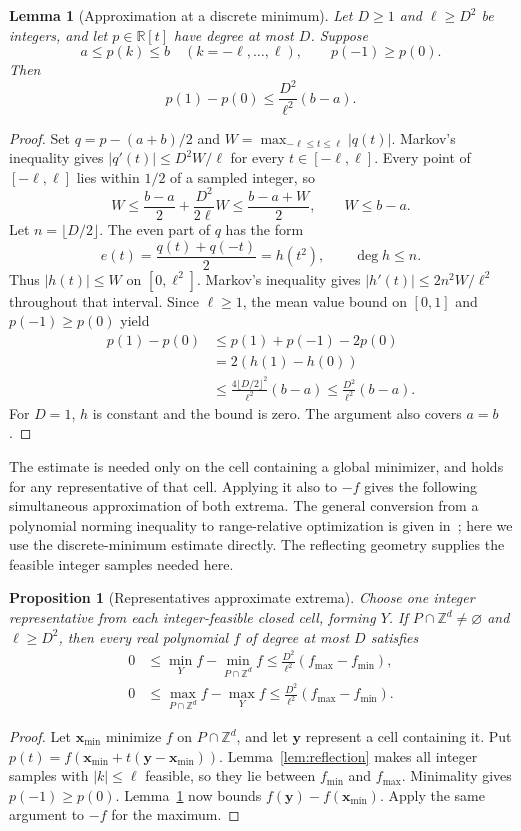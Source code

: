 \documentclass[final,5p,times,twocolumn]{elsarticle}
\newtheorem{lemma}[theorem]{Lemma}
\newtheorem{proposition}[theorem]{Proposition}
\theoremstyle{definition}\newtheorem{definition}{Definition}[section]
\theoremstyle{remark}\newtheorem{remark}[theorem]{Remark}
\newcommand{\R}{\mathbb R}\newcommand{\Q}{\mathbb Q}\newcommand{\Z}{\mathbb Z}
\begin{document}
\begin{lemma}[Approximation at a discrete minimum]\label{lem:markov}
Let $D\ge1$ and $\ell\ge D^2$ be integers, and let $p\in\R[t]$ have degree at most $D$. Suppose
\[
 a\le p(k)\le b\quad(k=-\ell,\ldots,\ell),\qquad p(-1)\ge p(0).
\]
Then
\[
 p(1)-p(0)\le \frac{D^2}{\ell^2}(b-a).
\]
\end{lemma}
\begin{proof}
Set $q=p-(a+b)/2$ and $W=\max_{-\ell\le t\le\ell}|q(t)|$. Markov's inequality gives $|q'(t)|\le D^2W/\ell$ for every $t\in[-\ell,\ell]$. Every point of $[-\ell,\ell]$ lies within $1/2$ of a sampled integer, so
\[
 W\le \frac{b-a}{2}+\frac{D^2}{2\ell}W\le\frac{b-a+W}{2},
 \qquad W\le b-a.
\]
Let $n=\lfloor D/2\rfloor$. The even part of $q$ has the form
\[
 e(t)=\frac{q(t)+q(-t)}2=h(t^2),\qquad \deg h\le n.
\]
Thus $|h(t)|\le W$ on $[0,\ell^2]$. Markov's inequality gives $|h'(t)|\le 2n^2W/\ell^2$ throughout that interval. Since $\ell\ge1$, the mean value bound on $[0,1]$ and $p(-1)\ge p(0)$ yield
\[
\begin{aligned}
 p(1)-p(0)&\le p(1)+p(-1)-2p(0)\\
 &=2(h(1)-h(0))\\
 &\le\frac{4\lfloor D/2\rfloor^2}{\ell^2}(b-a)
 \le\frac{D^2}{\ell^2}(b-a).
\end{aligned}
\]
For $D=1$, $h$ is constant and the bound is zero. The argument also covers $a=b$.
\end{proof}

The estimate is needed only on the cell containing a global minimizer, and holds for any representative of that cell. Applying it also to $-f$ gives the following simultaneous approximation of both extrema. The general conversion from a polynomial norming inequality to range-relative optimization is given in~\cite[Proposition~1]{PV}; here we use the discrete-minimum estimate directly. The reflecting geometry supplies the feasible integer samples needed here.

\begin{proposition}[Representatives approximate extrema]\label{prop:extrema}
Choose one integer representative from each integer-feasible closed cell, forming $Y$. If $P\cap\Z^d\ne\varnothing$ and $\ell\ge D^2$, then every real polynomial $f$ of degree at most $D$ satisfies
\[
\begin{aligned}
 0&\le\min_Y f-\min_{P\cap\Z^d} f\le\frac{D^2}{\ell^2}(f_{\max}-f_{\min}),\\
 0&\le\max_{P\cap\Z^d} f-\max_Y f\le\frac{D^2}{\ell^2}(f_{\max}-f_{\min}).
\end{aligned}
\]
\end{proposition}
\begin{proof}
Let $\mathbf{x}_{\min}$ minimize $f$ on $P\cap\Z^d$, and let $\mathbf{y}$ represent a cell containing it. Put $p(t)=f(\mathbf{x}_{\min}+t(\mathbf{y}-\mathbf{x}_{\min}))$. Lemma~\ref{lem:reflection} makes all integer samples with $|k|\le \ell$ feasible, so they lie between $f_{\min}$ and $f_{\max}$. Minimality gives $p(-1)\ge p(0)$. Lemma~\ref{lem:markov} now bounds $f(\mathbf{y})-f(\mathbf{x}_{\min})$. Apply the same argument to $-f$ for the maximum.
\end{proof}
\end{document}
